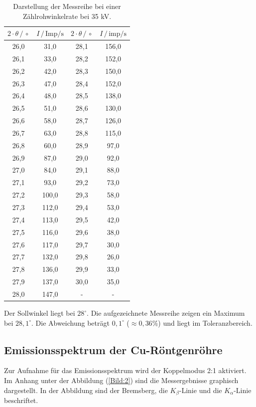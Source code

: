 \begin{table}[H]
  \centering
  \caption{Darstellung der Messreihe bei einer Zählrohwinkelrate bei 35 kV.}
  \label{tab:2}
  \begin{tabular}{c c c c}
  \toprule
  $2\cdot\theta \, / \, \circ$&	$I \, / \, \text{Imp/s}$ &$2\cdot\theta \, / \, \circ$&	$I \, / \, \text{imp/s}$ \\
  \midrule
  26,0&	31,0 &  28,1 &	156,0 \\
  26,1&	33,0 &  28,2 &  152,0 \\
  26,2&	42,0 &  28,3 &  150,0 \\
  26,3&	47,0 &  28,4 &  152,0 \\
  26,4&	48,0 &  28,5 &  138,0 \\
  26,5&	51,0 &  28,6 &  130,0 \\
  26,6&	58,0 &  28,7 &  126,0 \\
  26,7&	63,0 &  28,8 &  115,0 \\
  26,8&	60,0 &  28,9 &   97,0 \\
  26,9&	87,0 &  29,0 &   92,0 \\
  27,0&	84,0 &  29,1 &   88,0 \\
  27,1&	93,0 &  29,2 &   73,0 \\
  27,2&	100,0&  29,3 &   58,0 \\
  27,3&	112,0&  29,4 &   53,0 \\
  27,4&	113,0&  29,5 &   42,0 \\
  27,5&	116,0&  29,6 &   38,0 \\
  27,6&	117,0&  29,7 &   30,0 \\
  27,7&	132,0&  29,8 &   26,0 \\
  27,8&	136,0&  29,9 &   33,0 \\
  27,9&	137,0&  30,0 &   35,0 \\
  28,0&	147,0&    -  &     -  \\
 \bottomrule
\end{tabular}
\end{table}
Der Sollwinkel liegt bei $28^\circ$. Die aufgezeichnete Messreihe zeigen ein Maximum bei $28,1^\circ$.
Die Abweichung beträgt $0,1^\circ$ ($\approx 0,36\%$) und liegt im Toleranzbereich.

\subsection{Emissionsspektrum der Cu-Röntgenröhre}
Zur Aufnahme für das Emissionsspektrum wird der Koppelmodus 2:1 aktiviert. Im Anhang unter der Abbildung (\ref{Bild:2})
sind die Messergebnisse graphisch dargestellt. In der Abbildung sind der Bremsberg, die
$K_\beta \text{-Linie}$ und die $K_\alpha \text{-Linie}$ beschriftet.

